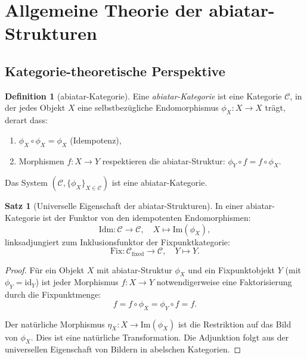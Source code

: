 \documentclass[a4paper,12pt]{article}
\theoremstyle{definition}
\newtheorem{definition}{Definition}
\newtheorem{satz}{Satz}
\begin{document}
\section{Allgemeine Theorie der abiatar-Strukturen}

\subsection{Kategorie-theoretische Perspektive}

\begin{definition}[abiatar-Kategorie]
Eine \textit{abiatar-Kategorie} ist eine Kategorie $\mathcal{C}$, in der jedes Objekt $X$ eine selbstbezügliche Endomorphismus $\phi_X: X \to X$ trägt, derart dass:
\begin{enumerate}
	\item $\phi_X \circ \phi_X = \phi_X$ (Idempotenz),
	\item Morphismen $f: X \to Y$ respektieren die abiatar-Struktur: $\phi_Y \circ f = f \circ \phi_X$.
\end{enumerate}
Das System $(\mathcal{C}, \{\phi_X\}_{X \in \mathcal{C}})$ ist eine abiatar-Kategorie.
\end{definition}

\begin{satz}[Universelle Eigenschaft der abiatar-Strukturen]
\label{satz:universal_property}
In einer abiatar-Kategorie ist der Funktor von den idempotenten Endomorphismen:
\[
\text{Idm}: \mathcal{C} \to \mathcal{C}, \quad X \mapsto \text{Im}(\phi_X),
\]
linksadjungiert zum Inklusionsfunktor der Fixpunktkategorie:
\[
\text{Fix}: \mathcal{C}_{\text{fixed}} \to \mathcal{C}, \quad Y \mapsto Y.
\]
\end{satz}

\begin{proof}
Für ein Objekt $X$ mit abiatar-Struktur $\phi_X$ und ein Fixpunktobjekt $Y$ (mit $\phi_Y = \text{id}_Y$) ist jeder Morphismus $f: X \to Y$ notwendigerweise eine Faktorisierung durch die Fixpunktmenge:
\[
f = f \circ \phi_X = \phi_Y \circ f = f.
\]

Der natürliche Morphismus $\eta_X: X \to \text{Im}(\phi_X)$ ist die Restriktion auf das Bild von $\phi_X$. Dies ist eine natürliche Transformation. Die Adjunktion folgt aus der universellen Eigenschaft von Bildern in abelschen Kategorien. 
\end{proof}
\end{document}
